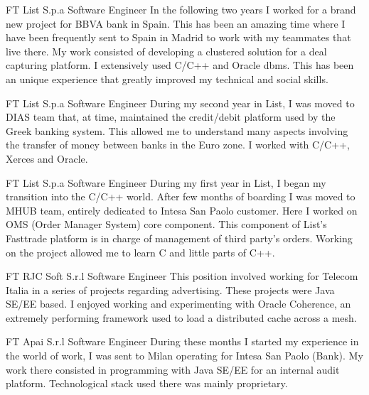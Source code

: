 \documentclass[10pt]{article} %
\begin{document}
\begin{paracol}{2}
{FT} %
{List S.p.a} %
{Software Engineer} %
{In the following two years I worked for a brand new project for BBVA bank in Spain. This has been an amazing time where I have been frequently sent to Spain in Madrid to work with my teammates that live there. My work consisted of developing a clustered solution for a deal capturing platform. I extensively used C/C++ and Oracle dbms. This has been an unique experience that greatly improved my technical and social skills.} %

{FT} %
{List S.p.a} %
{Software Engineer} %
{During my second year in List, I was moved to DIAS team that, at time, maintained the credit/debit platform used by the Greek banking system. This allowed me to understand many aspects involving the transfer of money between banks in the Euro zone. I worked with C/C++, Xerces and Oracle. } %

{FT} %
{List S.p.a} %
{Software Engineer} %
{During my first year in List, I began my transition into the C/C++ world. After few months of boarding I was moved to MHUB team, entirely dedicated to Intesa San Paolo customer. Here I worked on OMS (Order Manager System) core component. This component of List's Fasttrade platform is in charge of management of third party's orders.
Working on the project allowed me to learn C and little parts of C++. } %


{FT} %
{RJC Soft S.r.l} %
{Software Engineer} %
{This position involved working for Telecom Italia in a series of projects regarding advertising. These projects were Java SE/EE based. I enjoyed working and experimenting with Oracle Coherence, an extremely performing framework used to load a distributed cache across a mesh.}  %


{FT} %
{Apai S.r.l} %
{Software Engineer} %
{During these months I started my experience in the world of work, I was sent to Milan operating for Intesa San Paolo (Bank). My work there consisted in programming with Java SE/EE for an internal audit platform. Technological stack used there was mainly proprietary. } %


\end{paracol}
\end{document}
